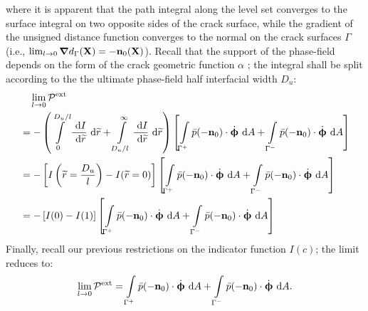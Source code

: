 where it is apparent that the path integral along the level set converges to the surface integral on two opposite sides of the crack surface, while the gradient of the unsigned distance function converges to the normal on the crack surfaces $\Gamma$ (i.e., $\lim_{l \to 0} \boldsymbol{\nabla} d_\Gamma(\textbf{X}) = -\textbf{n}_0(\textbf{X})$). Recall that the support of the phase-field depends on the form of the crack geometric function $\alpha$ \cite{JYWu2017}; the integral shall be split according to the the ultimate phase-field half interfacial width $D_u$:
\begin{equation}
  \begin{aligned}
     & \quad \lim_{l \to 0} \mathcal{P}^\text{ext}                                                                                                                                                                                                                                                                                                            \\
     & = - \left( \int\limits_0^{D_u/l} \dfrac{\text{ d}I}{\text{ d}\widetilde{r}} \text{ d}\widetilde{r} + \int\limits_{D_u/l}^\infty \dfrac{\text{ d}I}{\text{ d}\widetilde{r}} \text{ d}\widetilde{r} \right) \left[ \int\limits_{\Gamma^+} \bar{p} (-\textbf{n}_0) \cdot \dot{\boldsymbol{\upphi}} \text{ d}A + \int\limits_{\Gamma^-} \bar{p} (-\textbf{n}_0) \cdot \dot{\boldsymbol{\upphi}} \text{ d}A \right] \\
     & = - \left[ I\left( \widetilde{r}=\dfrac{D_u}{l} \right) - I(\widetilde{r}=0) \right] \left[ \int\limits_{\Gamma^+} \bar{p} (-\textbf{n}_0) \cdot \dot{\boldsymbol{\upphi}} \text{ d}A + \int\limits_{\Gamma^-} \bar{p} (-\textbf{n}_0) \cdot \dot{\boldsymbol{\upphi}} \text{ d}A \right]                                                                                                          \\
     & = - \left[ I(0) - I(1) \right] \left[ \int\limits_{\Gamma^+} \bar{p} (-\textbf{n}_0) \cdot \dot{\boldsymbol{\upphi}} \text{ d}A + \int\limits_{\Gamma^-} \bar{p} (-\textbf{n}_0) \cdot \dot{\boldsymbol{\upphi}} \text{ d}A \right]                                                                                                                                                                
  \end{aligned}
\end{equation}
Finally, recall our previous restrictions on the indicator function $I(c)$; the limit reduces to:
\begin{align}
  \lim_{l \to 0} \mathcal{P}^\text{ext} = \int\limits_{\Gamma^+} \bar{p} (-\textbf{n}_0) \cdot \dot{\boldsymbol{\upphi}} \text{ d}A + \int\limits_{\Gamma^-} \bar{p} (-\textbf{n}_0) \cdot \dot{\boldsymbol{\upphi}} \text{ d}A.
\end{align}

